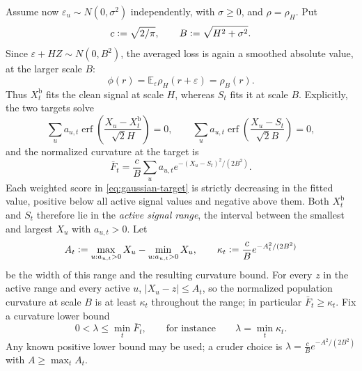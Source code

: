 \documentclass[11pt]{article}
\newcommand{\E}{\mathbb{E}}
\newcommand{\eqdef}{\mathrel{\vcentcolon=}}
\newcommand{\rhohum}{\phi}
\newcommand{\Signal}{X}
\newcommand{\BiasedSignal}{X^{\mathrm b}}
\newcommand{\IMFs}{S}
\theoremstyle{definition}
\begin{document}
Assume now \(\varepsilon_u\sim N(0,\sigma^2)\) independently, with
\(\sigma\geq0\), and \(\rho=\rho_H\).  Put
\begin{equation}
  c\eqdef\sqrt{2/\pi},\qquad B\eqdef\sqrt{H^2+\sigma^2}.
  \label{eq:gaussian-scale}
\end{equation}
Since \(\varepsilon+HZ\sim N(0,B^2)\), the averaged loss is again a smoothed
absolute value, at the larger scale \(B\):
\begin{equation}
  \rhohum(r)=\E_\varepsilon\rho_H(r+\varepsilon)=\rho_B(r).
  \label{eq:gaussian-convolution}
\end{equation}
Thus \(\BiasedSignal_t\) fits the clean signal at scale \(H\), whereas
\(\IMFs_t\) fits it at scale \(B\).  Explicitly, the two targets solve
\begin{equation}
  \sum_u a_{u,t}\operatorname{erf}\!\left(\frac{\Signal_u-\BiasedSignal_t}{\sqrt2H}\right)=0,
  \qquad
  \sum_u a_{u,t}\operatorname{erf}\!\left(\frac{\Signal_u-\IMFs_t}{\sqrt2B}\right)=0,
  \label{eq:gaussian-target}
\end{equation}
and the normalized curvature at the target is
\begin{equation}
  \bar F_t=\frac cB\sum_u a_{u,t}e^{-(\Signal_u-\IMFs_t)^2/(2B^2)}.
  \label{eq:gaussian-curvature}
\end{equation}
Each weighted score in \eqref{eq:gaussian-target} is strictly decreasing in
the fitted value, positive below all active signal values and negative above
them.  Both \(\BiasedSignal_t\) and \(\IMFs_t\) therefore lie in the
\emph{active signal range}, the interval between the smallest and largest
\(\Signal_u\) with \(a_{u,t}>0\).  Let
\begin{equation}
  A_t\eqdef\max_{u:a_{u,t}>0}\Signal_u-\min_{u:a_{u,t}>0}\Signal_u,
  \qquad
  \kappa_t\eqdef\frac cB e^{-A_t^2/(2B^2)}
  \label{eq:shift-constants}
\end{equation}
be the width of this range and the resulting curvature bound.  For every
\(z\) in the active range and every active \(u\), \(|\Signal_u-z|\leq A_t\),
so the normalized population curvature at scale \(B\) is at least
\(\kappa_t\) throughout the range; in particular \(\bar F_t\geq\kappa_t\).
Fix a curvature lower bound
\begin{equation}
  0<\lambda\leq\min_t\bar F_t,
  \qquad\text{for instance}\qquad
  \lambda=\min_t\kappa_t.
  \label{eq:curvature-lower-bound}
\end{equation}
Any known positive lower bound may be used; a cruder choice is
\(\lambda=\frac cBe^{-A^2/(2B^2)}\) with \(A\geq\max_tA_t\).
\end{document}
